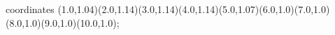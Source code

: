 					coordinates { (1.0,1.04)(2.0,1.14)(3.0,1.14)(4.0,1.14)(5.0,1.07)(6.0,1.0)(7.0,1.0)(8.0,1.0)(9.0,1.0)(10.0,1.0)};